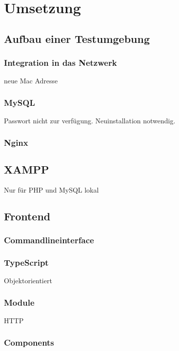 \chapter{Umsetzung}

\section{Aufbau einer Testumgebung}
\label{sec:integration_ace}

\subsection{Integration in das Netzwerk}
neue Mac Adresse

\subsection{MySQL}
Passwort nicht zur verfügung. Neuinstallation notwendig.

\subsection{Nginx}

\section{XAMPP}
Nur für PHP und MySQL lokal 






\section{Frontend}

\subsection{Commandlineinterface}

\subsection{TypeScript}
Objektorientiert

\subsection{Module}
HTTP

\subsection{Components}

